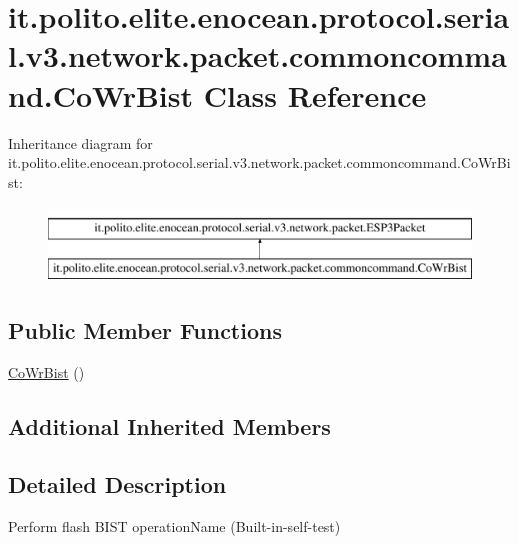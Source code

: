 \hypertarget{classit_1_1polito_1_1elite_1_1enocean_1_1protocol_1_1serial_1_1v3_1_1network_1_1packet_1_1commoncommand_1_1_co_wr_bist}{}\section{it.\+polito.\+elite.\+enocean.\+protocol.\+serial.\+v3.\+network.\+packet.\+commoncommand.\+Co\+Wr\+Bist Class Reference}
\label{classit_1_1polito_1_1elite_1_1enocean_1_1protocol_1_1serial_1_1v3_1_1network_1_1packet_1_1commoncommand_1_1_co_wr_bist}
Inheritance diagram for it.\+polito.\+elite.\+enocean.\+protocol.\+serial.\+v3.\+network.\+packet.\+commoncommand.\+Co\+Wr\+Bist\+:\begin{figure}[H]
\begin{center}
\leavevmode
\includegraphics[height=2.000000cm]{classit_1_1polito_1_1elite_1_1enocean_1_1protocol_1_1serial_1_1v3_1_1network_1_1packet_1_1commoncommand_1_1_co_wr_bist}
\end{center}
\end{figure}
\subsection*{Public Member Functions}
\begin{DoxyCompactItemize}
\item 
\hyperlink{classit_1_1polito_1_1elite_1_1enocean_1_1protocol_1_1serial_1_1v3_1_1network_1_1packet_1_1commoncommand_1_1_co_wr_bist_a9170729c969f69d09bc7c89d777035be}{Co\+Wr\+Bist} ()
\end{DoxyCompactItemize}
\subsection*{Additional Inherited Members}


\subsection{Detailed Description}
Perform flash B\+I\+ST operationName (Built-\/in-\/self-\/test)

